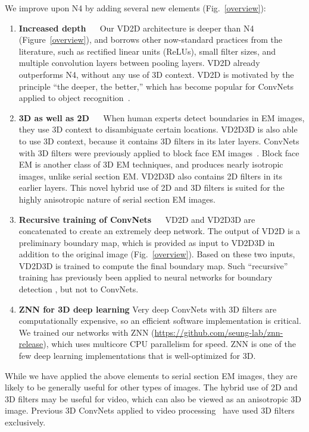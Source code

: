\documentclass{article} %
\begin{document}
We improve upon N4 by adding several new elements (Fig.~\ref{overview}):
\begin{enumerate}[]
\item{\bf Increased depth} $\quad$  Our VD2D architecture is deeper than N4 (Figure~\ref{overview}), and borrows other now-standard practices from the literature, such as rectified linear units (ReLUs), small filter sizes, and multiple convolution layers between pooling layers.  VD2D already outperforms N4, without any use of 3D context. VD2D is motivated by the principle ``the deeper, the better,'' which has become popular for ConvNets applied to object recognition~\cite{Krizhevsky2012,Simonyan2015,He2015}.
\item{\bf 3D as well as 2D} $\quad$ When human experts detect boundaries in EM images, they use 3D context to disambiguate certain locations. VD2D3D is also able to use 3D context, because it contains 3D filters in its later layers. ConvNets with 3D filters were previously applied to block face EM images~\cite{Helmstaedter2013,Kim2014,Turaga2010}. Block face EM is another class of 3D EM techniques, and produces nearly isotropic images, unlike serial section EM.  VD2D3D also contains 2D filters in its earlier layers. This novel hybrid use of 2D and 3D filters is suited for the highly anisotropic nature of serial section EM images.
\item{\bf Recursive training of ConvNets} $\quad$ VD2D and VD2D3D are concatenated to create an extremely deep network. The output of VD2D is a preliminary boundary map, which is provided as input to VD2D3D in addition to the original image (Fig.~\ref{overview}). Based on these two inputs, VD2D3D is trained to compute the final boundary map.  Such ``recursive'' training has previously been applied to neural networks for boundary detection \cite{Jurrus2010,Huang2014,Seyedhosseini2013}, but not to ConvNets.
\item{\bf ZNN for 3D deep learning} Very deep ConvNets with
  3D filters are computationally expensive, so an efficient software
  implementation is critical.  We trained our networks with ZNN (\url{https://github.com/seung-lab/znn-release}), which uses multicore CPU parallelism for speed. ZNN is one of the few deep learning implementations that is well-optimized for 3D.

\end{enumerate}


While we have applied the above elements to serial section EM images,
they are likely to be generally useful for other types of images. The
hybrid use of 2D and 3D filters may be useful for video, which can
also be viewed as an anisotropic 3D image.  Previous 3D ConvNets
applied to video processing~\cite{Tran2014,Yao2015} have used 3D
filters exclusively.
\end{document}
